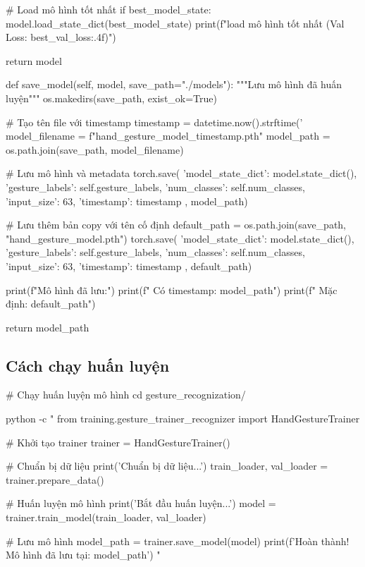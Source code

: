 \begin{aivncodebox}
\begin{python}
        # Load mô hình tốt nhất
        if best_model_state:
            model.load_state_dict(best_model_state)
            print(f" load mô hình tốt nhất (Val Loss: {best_val_loss:.4f})")
        
        return model
    
    def save_model(self, model, save_path="./models"):
        """Lưu mô hình đã huấn luyện"""
        os.makedirs(save_path, exist_ok=True)
        
        # Tạo tên file với timestamp
        timestamp = datetime.now().strftime('%
        model_filename = f"hand_gesture_model_{timestamp}.pth"
        model_path = os.path.join(save_path, model_filename)
        
        # Lưu mô hình và metadata
        torch.save({
            'model_state_dict': model.state_dict(),
            'gesture_labels': self.gesture_labels,
            'num_classes': self.num_classes,
            'input_size': 63,
            'timestamp': timestamp
        }, model_path)
        
        # Lưu thêm bản copy với tên cố định
        default_path = os.path.join(save_path, "hand_gesture_model.pth")
        torch.save({
            'model_state_dict': model.state_dict(),
            'gesture_labels': self.gesture_labels,
            'num_classes': self.num_classes,
            'input_size': 63,
            'timestamp': timestamp
        }, default_path)
        
        print(f"Mô hình đã lưu:")
        print(f"  Có timestamp: {model_path}")
        print(f"  Mặc định: {default_path}")
        
        return model_path
\end{python}
\end{aivncodebox}

\subsection{Cách chạy huấn luyện}

\begin{aivncodebox}
\begin{python}
# Chạy huấn luyện mô hình
cd gesture_recognization/

python -c "
from training.gesture_trainer_recognizer import HandGestureTrainer

# Khởi tạo trainer
trainer = HandGestureTrainer()

# Chuẩn bị dữ liệu
print('Chuẩn bị dữ liệu...')
train_loader, val_loader = trainer.prepare_data()

# Huấn luyện mô hình
print('Bắt đầu huấn luyện...')
model = trainer.train_model(train_loader, val_loader)

# Lưu mô hình
model_path = trainer.save_model(model)
print(f'Hoàn thành! Mô hình đã lưu tại: {model_path}')
"
\end{python}
\end{aivncodebox}

